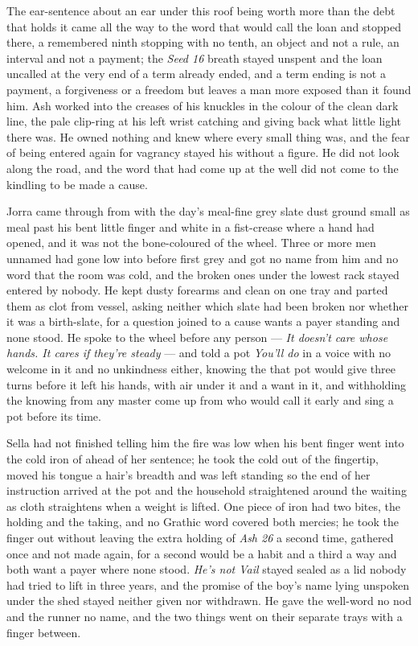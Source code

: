 The ear-sentence about an ear under this roof being worth more than the debt that holds it came all the way to the word that would call the loan and stopped there, a remembered ninth stopping with no tenth, an object and not a rule, an interval and not a payment; the \emph{Seed 16} breath stayed unspent and the loan uncalled at the very end of a term already ended, and a term ending is not a payment, a forgiveness or a freedom but leaves a man more exposed than it found him. Ash worked into the creases of his knuckles in the colour of the clean dark line, the pale clip-ring at his left wrist catching and giving back what little light there was. He owned nothing and knew where every small thing was, and the fear of being entered again for vagrancy stayed his without a figure. He did not look along the road, and the word that had come up at the well did not come to the kindling to be made a cause.

Jorra came through  from  with the day's meal-fine grey slate dust ground small as meal past his bent little finger and white in a fist-crease where a hand had opened, and it was not the bone-coloured  of the wheel. Three or more men unnamed had gone low into  before first grey and got no name from him and no word that the room was cold, and the broken ones under the lowest rack stayed entered by nobody. He kept dusty forearms and clean on one tray and parted them as clot from vessel, asking neither which slate had been broken nor whether it was a birth-slate, for a question joined to a cause wants a payer standing and none stood. He spoke to the wheel before any person --- \emph{It doesn't care whose hands. It cares if they're steady} --- and told a pot \emph{You'll do} in a voice with no welcome in it and no unkindness either, knowing the  that pot would give three turns before it left his hands, with air under it and a want in it, and withholding the knowing from any master come up from  who would call it early and sing a pot before its time.

Sella had not finished telling him the fire was low when his bent finger went into the cold iron of  ahead of her sentence; he took the cold out of the fingertip, moved his tongue a hair's breadth and was left standing so the end of her instruction arrived at the pot and the household straightened around the waiting as cloth straightens when a weight is lifted. One piece of iron had two bites, the holding and the taking, and no Grathic word covered both mercies; he took the finger out without leaving the extra holding of \emph{Ash 26} a second time, gathered once and not made again, for a second would be a habit and a third a way and both want a payer where none stood. \emph{He's not Vail} stayed sealed as a lid nobody had tried to lift in three years, and the promise of the boy's name lying unspoken under the shed stayed neither given nor withdrawn. He gave the well-word no nod and the runner no name, and the two things went on their separate trays with a finger between.

